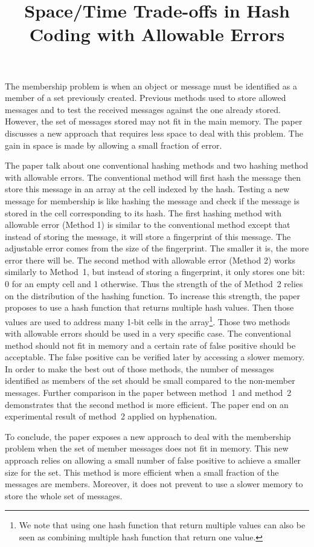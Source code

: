 \documentclass{article}
\title{Space/Time Trade-offs in Hash Coding with Allowable Errors}
\begin{document}
\maketitle
The membership problem is when an object or message must be identified as a member of a set previously created.
Previous methods used to store allowed messages and to test the received messages against the one already stored.
However, the set of messages stored may not fit in the main memory.
The paper discusses a new approach that requires less space to deal with this problem.
The gain in space is made by allowing a small fraction of error.

The paper talk about one conventional hashing methods and two hashing method with allowable errors.
The conventional method will first hash the message then store this message in an array
at the cell indexed by the hash.
Testing a new message for membership is like hashing the message and check if the message is stored
in the cell corresponding to its hash.
The first hashing method with allowable error (Method 1) is similar to the conventional method except
that instead of storing the message, it will store a fingerprint of this message. 
The adjustable error comes from the size of the fingerprint.
The smaller it is, the more error there will be.
The second method with allowable error (Method 2) works similarly to Method~1, but instead of storing
a fingerprint, it only stores one bit: 0 for an empty cell and 1 otherwise.
Thus the strength of the of Method~2 relies on the distribution of the hashing function.
To increase this strength, the paper proposes to use a hash function that returns multiple hash values.
Then those values are used to address many 1-bit cells in the array\footnote{We note that using one hash function
that return multiple values can also be seen as combining multiple hash function that return one value.}.
Those two methods with allowable errors should be used in a very specific case.
The conventional method should not fit in memory and a certain rate of false positive should be acceptable.
The false positive can be verified later by accessing a slower memory.
In order to make the best out of those methods, the number of messages identified as members of the set should be small
compared to the non-member messages. 
Further comparison in the paper between method~1 and method~2 demonstrates that the second method is more efficient.
The paper end on an experimental result of method~2 applied on hyphenation.

To conclude, the paper exposes a new approach to deal with the membership problem when the set of member messages
does not fit in memory. This new approach relies on allowing a small number of false positive to achieve a smaller
size for the set. This method is more efficient when a small fraction of the messages are members. Moreover, it does not prevent
to use a slower memory to store the whole set of messages.
\end{document}
